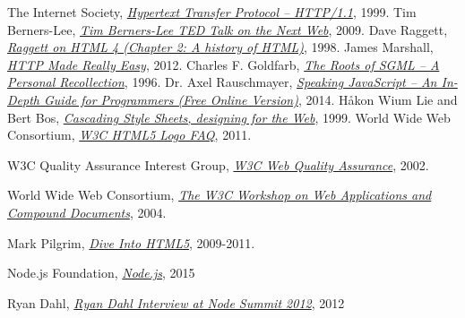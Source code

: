 
\begin{thebibliography}{99}

  The Internet Society,
  \emph{\href{http://tools.ietf.org/html/rfc2616}{Hypertext Transfer Protocol -- HTTP/1.1}},  
  1999.
  Tim Berners-Lee,
  \emph{\href{http://www.ted.com/talks/tim_berners_lee_on_the_next_web?language=en}{Tim Berners-Lee TED Talk on the Next Web}},  
  2009.
  Dave Raggett,
  \emph{\href{http://www.w3.org/People/Raggett/book4/ch02.html}{Raggett on HTML 4 (Chapter 2: A history of HTML)}},  
  1998.
  James Marshall,
  \emph{\href{http://www.jmarshall.com/easy/http/}{HTTP Made Really Easy}},  
  2012.
Charles F. Goldfarb,
\emph{\href{http://www.sgmlsource.com/history/roots.htm}{The Roots of SGML -- A Personal Recollection}},  
1996.
Dr. Axel Rauschmayer,
\emph{\href{http://speakingjs.com/es5/}{Speaking JavaScript -- An In-Depth Guide for Programmers (Free Online Version)}},  
2014.
Håkon Wium Lie and Bert Bos,
\emph{\href{http://www.w3.org/Style/LieBos2e/history/Overview.html}{Cascading Style Sheets, designing for the Web}},  
1999.
World Wide Web Consortium,
\emph{\href{http://www.w3.org/html/logo/faq.html}{W3C HTML5 Logo FAQ}},  
2011.

W3C Quality Assurance Interest Group,
\emph{\href{http://www.w3.org/QA/2002/04/Web-Quality}{W3C Web Quality Assurance}},  
2002.

World Wide Web Consortium,
\emph{\href{http://www.w3.org/2004/04/webapps-cdf-ws/}{The W3C Workshop on Web Applications and Compound Documents}},  
2004.

Mark Pilgrim,
\emph{\href{http://diveintohtml5.info/index.html}{Dive Into HTML5}},  
2009-2011.

Node.js Foundation,
\emph{\href{https://nodejs.org/}{Node.js}},  
2015

Ryan Dahl,
\emph{\href{https://youtu.be/Fc26auhSLqM?t=1m32s}{Ryan Dahl Interview at Node Summit 2012}},  
2012


\end{thebibliography}